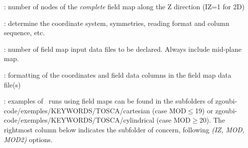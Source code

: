   
 : number of nodes of the \textsl{complete} field map along the Z direction (IZ=1 for 2D)

 : determine the coordinate system,  symmetries, reading format and column sequence,  etc.

 : number of field map input data files to be declared. Always include mid-plane map.

 : formatting of the coordinates and field data columns in the field map data file(s) 

 : examples of \zgoubi\ runs using field maps can be found in the subfolders 
of zgoubi-code/exemples/KEYWORDS/TOSCA/cartesian (case MOD$\leq$19) or  zgoubi-code/exemples/KEYWORDS/TOSCA/cylindrical (case MOD$\geq$20). The rightmost column  below 
indicates the  subfolder of concern, following \textsl{(IZ, MOD, MOD2)} options. 

\centering

\renewcommand{\arraystretch}{1}

